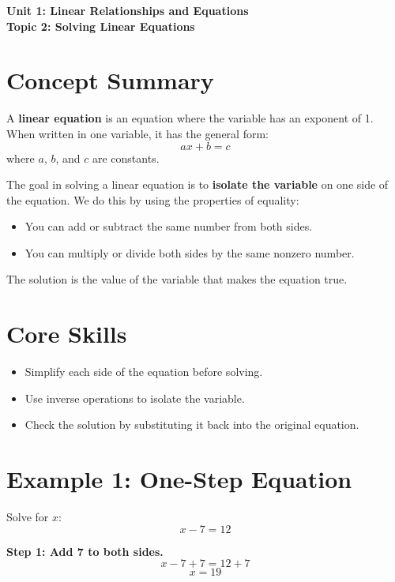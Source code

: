 \documentclass[14pt]{extarticle}
\begin{document}
\raggedright
{}

\begin{center}
    \LARGE \textbf{Unit 1: Linear Relationships and Equations} \\[6pt]
    \Large \textbf{Topic 2: Solving Linear Equations}
\end{center}

\vspace{1em}

\section*{Concept Summary}

A \textbf{linear equation} is an equation where the variable has an exponent of 1.  
When written in one variable, it has the general form:
\[
ax + b = c
\]
where \(a\), \(b\), and \(c\) are constants.

The goal in solving a linear equation is to \textbf{isolate the variable} on one side of the equation.  
We do this by using the properties of equality:
\begin{itemize}
    \item You can add or subtract the same number from both sides.
    \item You can multiply or divide both sides by the same nonzero number.
\end{itemize}

The solution is the value of the variable that makes the equation true.

\section*{Core Skills}
\begin{itemize}
    \item Simplify each side of the equation before solving.
    \item Use inverse operations to isolate the variable.
    \item Check the solution by substituting it back into the original equation.
\end{itemize}

\section*{Example 1: One-Step Equation}

Solve for \(x\):
\[
x - 7 = 12
\]

\textbf{Step 1: Add 7 to both sides.}
\[
x - 7 + 7 = 12 + 7
\]
\[
x = 19
\]
\end{document}
